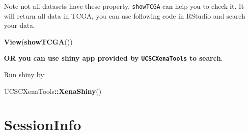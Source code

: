 \documentclass[nofonts,]{tufte-handout}
\newenvironment{Shaded}{\begin{snugshade}}{\end{snugshade}}
\newcommand{\KeywordTok}[1]{\textcolor[rgb]{0.13,0.29,0.53}{\textbf{#1}}}
\newcommand{\NormalTok}[1]{#1}
\newcommand{\OperatorTok}[1]{\textcolor[rgb]{0.81,0.36,0.00}{\textbf{#1}}}
\begin{document}
Note not all datasets have these property, \texttt{showTCGA} can help
you to check it. It will return all data in TCGA, you can use following
code in RStudio and search your data.

\begin{Shaded}
\begin{Highlighting}[]
\KeywordTok{View}\NormalTok{(}\KeywordTok{showTCGA}\NormalTok{())}
\end{Highlighting}
\end{Shaded}

\textbf{OR you can use shiny app provided by \texttt{UCSCXenaTools} to
search}.

Run shiny by:

\begin{Shaded}
\begin{Highlighting}[]
\NormalTok{UCSCXenaTools}\OperatorTok{::}\KeywordTok{XenaShiny}\NormalTok{()}
\end{Highlighting}
\end{Shaded}

\hypertarget{sessioninfo}{%
\section{SessionInfo}\label{sessioninfo}}
\end{document}
